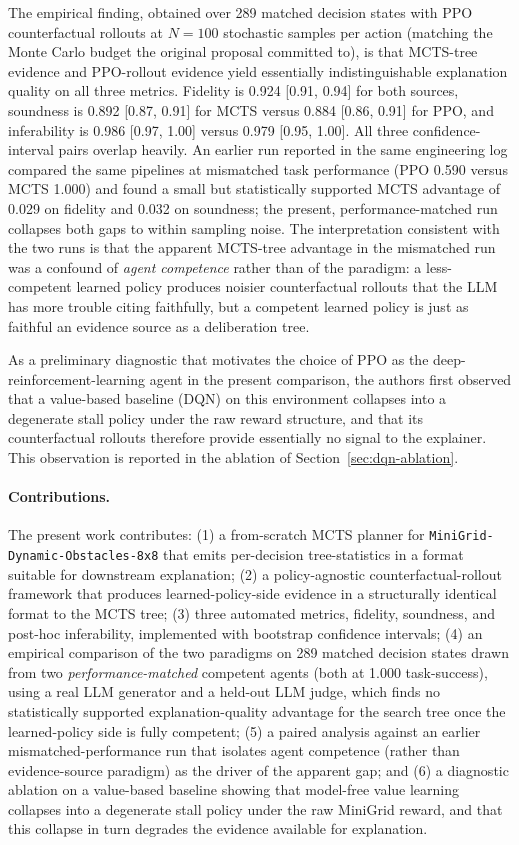 \documentclass[conference]{IEEEtran}
\begin{document}
The empirical finding, obtained over 289 matched decision states with
PPO counterfactual rollouts at $N=100$ stochastic samples per action
(matching the Monte Carlo budget the original proposal committed to),
is that MCTS-tree evidence and PPO-rollout evidence yield essentially
indistinguishable explanation quality on all three metrics. Fidelity
is 0.924 [0.91, 0.94] for both sources, soundness is 0.892 [0.87,
0.91] for MCTS versus 0.884 [0.86, 0.91] for PPO, and inferability is
0.986 [0.97, 1.00] versus 0.979 [0.95, 1.00]. All three
confidence-interval pairs overlap heavily. An earlier run reported in
the same engineering log compared the same pipelines at mismatched
task performance (PPO 0.590 versus MCTS 1.000) and found a small but
statistically supported MCTS advantage of 0.029 on fidelity and 0.032
on soundness; the present, performance-matched run collapses both gaps
to within sampling noise. The interpretation consistent with the two
runs is that the apparent MCTS-tree advantage in the mismatched run
was a confound of \emph{agent competence} rather than of the
paradigm: a less-competent learned policy produces noisier
counterfactual rollouts that the LLM has more trouble citing
faithfully, but a competent learned policy is just as faithful an
evidence source as a deliberation tree.

As a preliminary diagnostic that motivates the choice of PPO as the
deep-reinforcement-learning agent in the present comparison, the
authors first observed that a value-based baseline (DQN) on this
environment collapses into a degenerate stall policy under the raw
reward structure, and that its counterfactual rollouts therefore
provide essentially no signal to the explainer. This observation is
reported in the ablation of Section~\ref{sec:dqn-ablation}.

\paragraph{Contributions.}
The present work contributes: (1) a from-scratch MCTS planner for
\texttt{MiniGrid-Dynamic-Obstacles-8x8} that emits per-decision
tree-statistics in a format suitable for downstream explanation;
(2) a policy-agnostic counterfactual-rollout framework that produces
learned-policy-side evidence in a structurally identical format to the
MCTS tree; (3) three automated metrics, fidelity, soundness, and
post-hoc inferability, implemented with bootstrap confidence intervals;
(4) an empirical comparison of the two paradigms on 289 matched
decision states drawn from two \emph{performance-matched} competent
agents (both at 1.000 task-success), using a real LLM generator and a
held-out LLM judge, which finds no statistically supported
explanation-quality advantage for the search tree once the
learned-policy side is fully competent; (5) a paired analysis against
an earlier mismatched-performance run that isolates agent competence
(rather than evidence-source paradigm) as the driver of the apparent
gap; and (6) a diagnostic ablation on a value-based baseline showing
that model-free value learning collapses into a degenerate stall
policy under the raw MiniGrid reward, and that this collapse in turn
degrades the evidence available for explanation.
\end{document}
